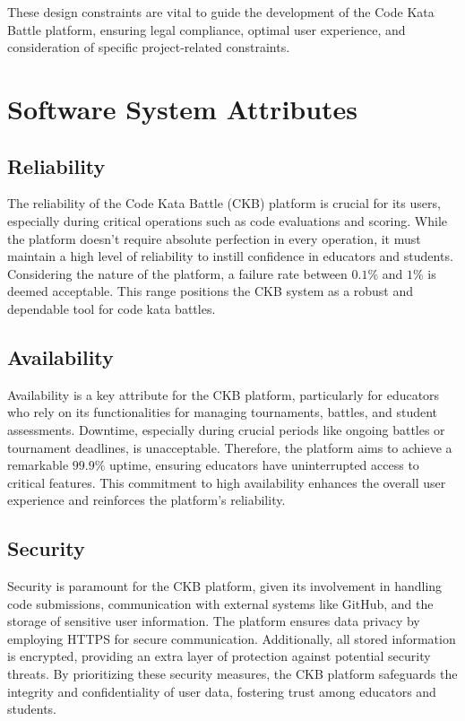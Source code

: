 These design constraints are vital to guide the development of the Code Kata Battle platform, ensuring legal compliance, optimal user experience, and consideration of specific project-related constraints.




\section{Software System Attributes}
\label{sec:software_system_attributes}%

\subsection{Reliability}
\label{subsec:reliability}%
The reliability of the Code Kata Battle (CKB) platform is crucial for its users, especially during critical operations such as code evaluations and scoring. 
While the platform doesn't require absolute perfection in every operation, it must maintain a high level of reliability to instill confidence in educators and students. 
Considering the nature of the platform, a failure rate between $0.1\%$ and $1\%$ is deemed acceptable. 
This range positions the CKB system as a robust and dependable tool for code kata battles.

\subsection{Availability}
\label{subsec:availability}%
Availability is a key attribute for the CKB platform, particularly for educators who rely on its functionalities for managing tournaments, battles, and student assessments. 
Downtime, especially during crucial periods like ongoing battles or tournament deadlines, is unacceptable. Therefore, the platform aims to achieve a remarkable $99.9\%$ uptime, ensuring educators have uninterrupted access to critical features. 
This commitment to high availability enhances the overall user experience and reinforces the platform's reliability.

\subsection{Security}
\label{subsec:security}%
Security is paramount for the CKB platform, given its involvement in handling code submissions, communication with external systems like GitHub, and the storage of sensitive user information. 
The platform ensures data privacy by employing HTTPS for secure communication. Additionally, all stored information is encrypted, providing an extra layer of protection against potential security threats. 
By prioritizing these security measures, the CKB platform safeguards the integrity and confidentiality of user data, fostering trust among educators and students.

